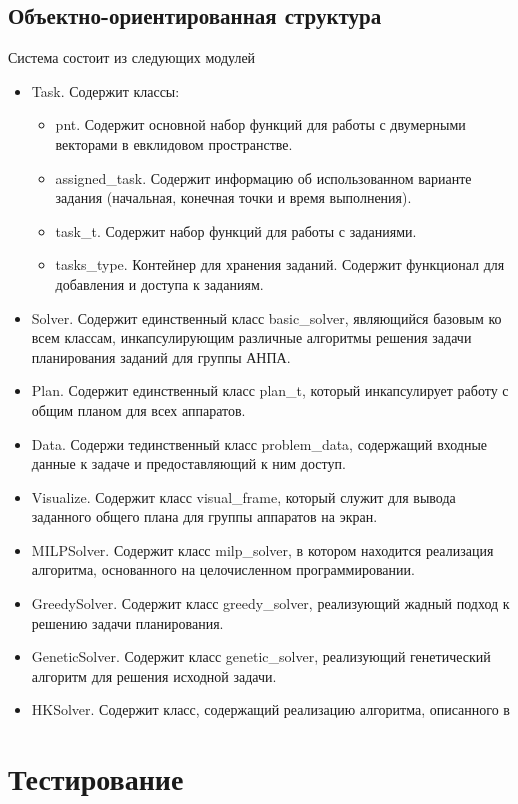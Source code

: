 \documentclass[a4paper,14pt,russian]{article}
\begin{document}
\subsection{Объектно-ориентированная структура}
Система состоит из следующих модулей
\begin{itemize}
\item Task. Содержит классы:
    \begin{itemize}
    \item pnt. Содержит основной набор функций для работы с двумерными векторами в евклидовом пространстве. %
    \item assigned\_task. Содержит информацию об использованном варианте задания (начальная, конечная точки и время выполнения). %
    \item task\_t. Содержит набор функций для работы с заданиями.
    \item tasks\_type. Контейнер для хранения заданий. Содержит функционал для добавления и доступа к заданиям.
    \end{itemize}
\item Solver. Содержит единственный класс basic\_solver, являющийся базовым ко всем классам, инкапсулирующим различные алгоритмы решения задачи планирования заданий для группы АНПА.
\item Plan. Содержит единственный класс plan\_t, который инкапсулирует работу с общим планом для всех аппаратов.
\item Data. Содержи тединственный класс problem\_data, содержащий входные данные к задаче и предоставляющий к ним доступ.
\item Visualize. Содержит класс visual\_frame, который служит для вывода заданного общего плана для группы аппаратов на экран.
\item MILPSolver. Содержит класс milp\_solver, в котором находится реализация алгоритма, основанного на целочисленном программировании.
\item GreedySolver. Содержит класс greedy\_solver, реализующий жадный подход к решению задачи планирования.
\item GeneticSolver. Содержит класс genetic\_solver, реализующий генетический алгоритм для решения исходной задачи.
\item HKSolver. Содержит класс, содержащий реализацию алгоритма, описанного в \cite{tuphanov1}
\end{itemize}


\section{Тестирование}
\end{document}
